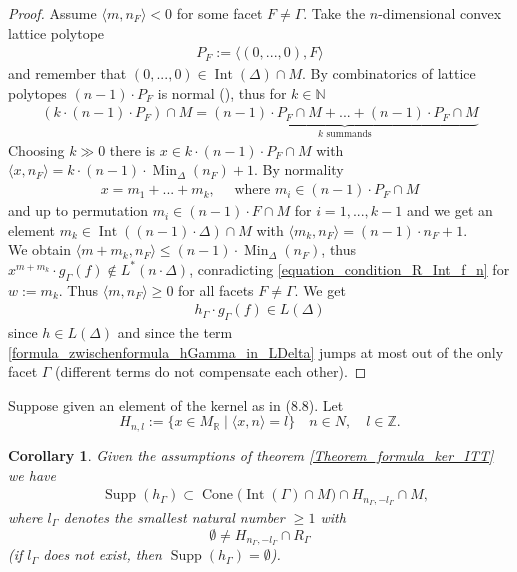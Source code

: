\documentclass[12pt, english]{article}
\newtheorem{corollar}[definition]{Corollary}
\DeclareMathOperator{\Int}{Int}
\DeclareMathOperator{\Min}{Min}
\DeclareMathOperator{\Supp}{Supp}
\DeclareMathOperator{\Cone}{Cone}
\begin{document}
\begin{proof}
	Assume $\langle m, n_{F} \rangle < 0$ for some facet $F \neq \Gamma$. Take the $n$-dimensional convex lattice polytope 
	\begin{align*}
		P_{F} := \Big\langle (0,...,0), F \Big\rangle
	\end{align*}
	and remember that $(0,...,0) \in \Int(\Delta) \cap M$. By combinatorics of lattice polytopes $(n-1) \cdot P_{F}$ is normal (\cite[Thm. 2.2.12]{CLS11}), thus for $k \in \mathbb{N}$
	\begin{align*}
		(k \cdot (n-1) \cdot P_{F}) \cap M = \underbrace{(n-1) \cdot P_{F} \cap M + ... + (n-1) \cdot P_{F} \cap M}_{k \textrm{ summands}}
	\end{align*}
	Choosing $k \gg 0$ there is $x \in k \cdot (n-1) \cdot P_{F} \cap M$ with$\langle x,n_{F} \rangle = k \cdot (n-1) \cdot \Min_{\Delta}(n_{F}) + 1$. By normality 
	\begin{align*}
		x = m_1 + ... + m_k, \quad \textrm{ where } m_i \in (n-1) \cdot P_{F} \cap M
	\end{align*}
	and up to permutation $m_i \in (n-1) \cdot F \cap M$ for $i=1,...,k-1$ and we get an element $m_k \in \Int((n-1) \cdot \Delta) \cap M$ with $\langle m_k,n_{F} \rangle = (n-1) \cdot n_{F} +1$. \\ 
	We obtain $\langle m + m_k, n_{F} \rangle \leq (n-1) \cdot \Min_{\Delta}(n_{F})$, thus $x^{m+m_k} \cdot g_{\Gamma}(f) \notin L^*(n \cdot \Delta)$, conradicting \ref{equation_condition_R_Int_f_n} for $w:= m_k$. Thus $\langle m,n_F \rangle \geq 0$ for all facets $F \neq \Gamma$. We get 
	\begin{align} \label{formula_zwischenformula_hGamma_in_LDelta}
		h_{\Gamma} \cdot g_{\Gamma}(f) \in L(\Delta)
	\end{align}
	since $h \in L(\Delta)$ and since the term \ref{formula_zwischenformula_hGamma_in_LDelta} jumps at most out of the only facet $\Gamma$ (different terms do not compensate each other).%
\end{proof}

	
	

Suppose given an element of the kernel as in (8.8). Let 
\[ H_{n,l} := \{ x \in M_{\mathbb{R}} \mid \langle x,n \rangle = l \} \quad n \in N, \quad l \in \mathbb{Z}.  \]
\begin{corollar} \label{lemma_def_l_i_Supp_h_Gamma_i}
	Given the assumptions of theorem \ref{Theorem_formula_ker_ITT} we have
	\begin{align} \label{support_h_Gamma_l_Gamma}
		& \Supp(h_{\Gamma}) \subset \Cone \big(\Int(\Gamma) \cap M \big) \cap H_{n_{\Gamma},-l_{\Gamma}} \cap M,
	\end{align}
	where $l_{\Gamma}$ denotes the smallest natural number $\geq 1$ with 
	\[ \emptyset \neq H_{n_{\Gamma}, -l_{\Gamma}} \cap R_{\Gamma} \]
	(if $l_{\Gamma}$ does not exist, then $\Supp(h_{\Gamma}) = \emptyset$).
\end{corollar}
\end{document}
